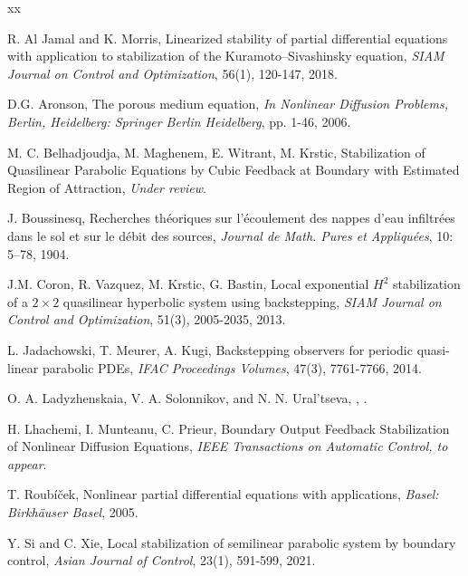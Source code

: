 \documentclass[twocolumn]{autart}
\begin{document}
 
\begin{thebibliography}{xx}  %

R. Al Jamal and K. Morris, 
\newblock Linearized stability of partial differential equations with application to stabilization of the Kuramoto--Sivashinsky equation,
\newblock \emph{SIAM Journal on Control and Optimization}, 56(1), 120-147, 2018.

D.G. Aronson,
\newblock The porous medium equation,
\newblock \emph{In Nonlinear Diffusion Problems, Berlin, Heidelberg: Springer Berlin Heidelberg}, pp. 1-46, 2006.

M. C. Belhadjoudja, M. Maghenem, E. Witrant, M. Krstic, 
\newblock Stabilization of Quasilinear Parabolic Equations by Cubic Feedback at Boundary with Estimated Region of Attraction,
\newblock \emph{Under review}.

J. Boussinesq,
\newblock Recherches théoriques sur l'écoulement des nappes d'eau infiltrées dans le sol et sur le débit des sources,
\newblock \emph{Journal de Math. Pures et Appliquées}, 10: 5–78, 1904.

J.M. Coron, R. Vazquez, M. Krstic, G. Bastin,
\newblock Local exponential $H^2$ stabilization of a $2\times2$ quasilinear hyperbolic system using backstepping,
\newblock \emph{SIAM Journal on Control and Optimization}, 51(3), 2005-2035, 2013.

L. Jadachowski, T. Meurer, A. Kugi,
\newblock Backstepping observers for periodic quasi-linear parabolic PDEs,
\newblock \emph{IFAC Proceedings Volumes}, 47(3), 7761-7766, 2014.

O. A. Ladyzhenskaia, V. A. Solonnikov, and N. N. Ural'tseva,
,
.

H. Lhachemi, I. Munteanu, C. Prieur,
\newblock Boundary Output Feedback Stabilization of Nonlinear Diffusion Equations,
\newblock \emph{IEEE Transactions on Automatic Control, to appear}.

T. Roubíček, 
\newblock Nonlinear partial differential equations with applications,
\newblock \emph{Basel: Birkhäuser Basel}, 2005.

Y. Si and C. Xie, 
\newblock Local stabilization of semilinear parabolic system by boundary control,
\newblock \emph{Asian Journal of Control}, 23(1), 591-599, 2021.


\end{thebibliography}
\end{document}
